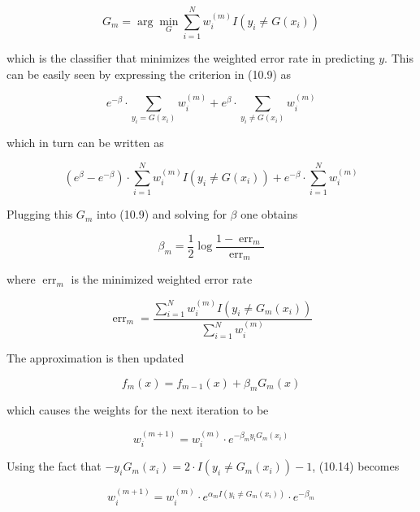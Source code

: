 \documentclass[10pt]{article}
\begin{document}
\begin{equation*}
G_{m}=\arg \min _{G} \sum_{i=1}^{N} w_{i}^{(m)} I\left(y_{i} \neq G\left(x_{i}\right)\right) \tag{10.10}
\end{equation*}


which is the classifier that minimizes the weighted error rate in predicting $y$. This can be easily seen by expressing the criterion in (10.9) as

$$
e^{-\beta} \cdot \sum_{y_{i}=G\left(x_{i}\right)} w_{i}^{(m)}+e^{\beta} \cdot \sum_{y_{i} \neq G\left(x_{i}\right)} w_{i}^{(m)}
$$

which in turn can be written as


\begin{equation*}
\left(e^{\beta}-e^{-\beta}\right) \cdot \sum_{i=1}^{N} w_{i}^{(m)} I\left(y_{i} \neq G\left(x_{i}\right)\right)+e^{-\beta} \cdot \sum_{i=1}^{N} w_{i}^{(m)} \tag{10.11}
\end{equation*}


Plugging this $G_{m}$ into (10.9) and solving for $\beta$ one obtains


\begin{equation*}
\beta_{m}=\frac{1}{2} \log \frac{1-\operatorname{err}_{m}}{\operatorname{err}_{m}} \tag{10.12}
\end{equation*}


where $\operatorname{err}_{m}$ is the minimized weighted error rate


\begin{equation*}
\operatorname{err}_{m}=\frac{\sum_{i=1}^{N} w_{i}^{(m)} I\left(y_{i} \neq G_{m}\left(x_{i}\right)\right)}{\sum_{i=1}^{N} w_{i}^{(m)}} \tag{10.13}
\end{equation*}


The approximation is then updated

$$
f_{m}(x)=f_{m-1}(x)+\beta_{m} G_{m}(x)
$$

which causes the weights for the next iteration to be


\begin{equation*}
w_{i}^{(m+1)}=w_{i}^{(m)} \cdot e^{-\beta_{m} y_{i} G_{m}\left(x_{i}\right)} \tag{10.14}
\end{equation*}


Using the fact that $-y_{i} G_{m}\left(x_{i}\right)=2 \cdot I\left(y_{i} \neq G_{m}\left(x_{i}\right)\right)-1$, (10.14) becomes


\begin{equation*}
w_{i}^{(m+1)}=w_{i}^{(m)} \cdot e^{\alpha_{m} I\left(y_{i} \neq G_{m}\left(x_{i}\right)\right)} \cdot e^{-\beta_{m}} \tag{10.15}
\end{equation*}
\end{document}
